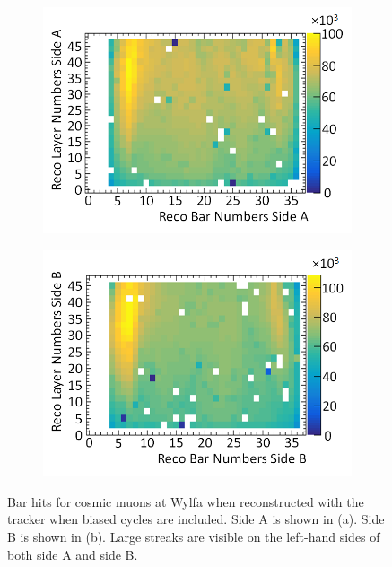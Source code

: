 \begin{figure}[!h]
\centering
\begin{subfigure}{.5\textwidth}
  \centering
  \includegraphics[width=\linewidth]{Chapter6/Figs/Raster/sideAHitsWithBadCyclesMedText.png}
  \captionsetup{width=.9\linewidth}
  \caption{} 
  \label{subFig:sideAHitsWithBadCycles}
\end{subfigure}%
\begin{subfigure}{.5\textwidth}
  \centering
\includegraphics[width=\linewidth]{Chapter6/Figs/Raster/sideBHitsWithBadCyclesMedText.png}
  \captionsetup{width=.9\linewidth}
  \caption{}
  \label{subFig:sideBHitsWithBadCycles}
\end{subfigure}
\caption[Cosmic muon bar hits when biased timing cycles are included.]{Bar hits for cosmic muons at Wylfa when reconstructed with the tracker when biased cycles are included. Side A is shown in (a). Side B is shown in (b). Large streaks are visible on the left-hand sides of both side A and side B.}
\label{fig:sideABHitsWithBadCycles}
\end{figure}

